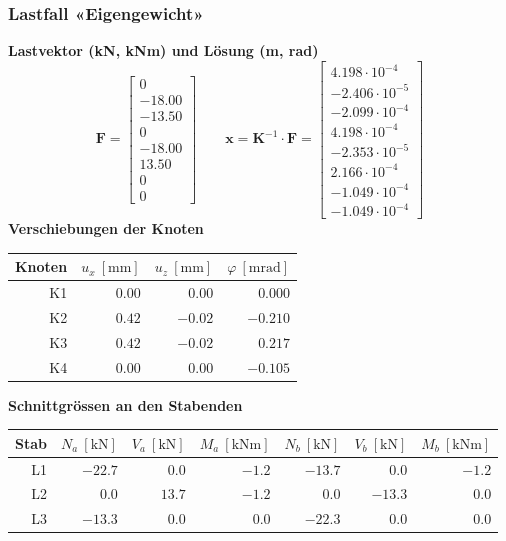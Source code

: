 \documentclass[11pt,a4paper]{article}
\begin{document}
\subsubsection{Lastfall «Eigengewicht»}
\noindent\textbf{Lastvektor (kN, kNm) und Lösung (m, rad)}
\begin{equation*}
\mathbf{F} = \begin{bmatrix} 0 \\ -18.00 \\ -13.50 \\ 0 \\ -18.00 \\ 13.50 \\ 0 \\ 0 \end{bmatrix} \qquad \mathbf{x} = \mathbf{K}^{-1} \cdot \mathbf{F} = \begin{bmatrix} 4.198 \cdot 10^{-4} \\ -2.406 \cdot 10^{-5} \\ -2.099 \cdot 10^{-4} \\ 4.198 \cdot 10^{-4} \\ -2.353 \cdot 10^{-5} \\ 2.166 \cdot 10^{-4} \\ -1.049 \cdot 10^{-4} \\ -1.049 \cdot 10^{-4} \end{bmatrix}
\end{equation*}
\noindent\textbf{Verschiebungen der Knoten}
\begin{longtable}{rrrr}
\hline
Knoten & $u_x\ [\mathrm{mm}]$ & $u_z\ [\mathrm{mm}]$ & $\varphi\ [\mathrm{mrad}]$ \\
\hline
\endhead
K1 & $0.00$ & $0.00$ & $0.000$ \\
K2 & $0.42$ & $-0.02$ & $-0.210$ \\
K3 & $0.42$ & $-0.02$ & $0.217$ \\
K4 & $0.00$ & $0.00$ & $-0.105$ \\
\hline
\end{longtable}
\noindent\textbf{Schnittgrössen an den Stabenden}
\begin{longtable}{rrrrrrr}
\hline
Stab & $N_{a}\ [\mathrm{kN}]$ & $V_{a}\ [\mathrm{kN}]$ & $M_{a}\ [\mathrm{kNm}]$ & $N_{b}\ [\mathrm{kN}]$ & $V_{b}\ [\mathrm{kN}]$ & $M_{b}\ [\mathrm{kNm}]$ \\
\hline
\endhead
L1 & $-22.7$ & $0.0$ & $-1.2$ & $-13.7$ & $0.0$ & $-1.2$ \\
L2 & $0.0$ & $13.7$ & $-1.2$ & $0.0$ & $-13.3$ & $0.0$ \\
L3 & $-13.3$ & $0.0$ & $0.0$ & $-22.3$ & $0.0$ & $0.0$ \\
\hline
\end{longtable}
\end{document}
